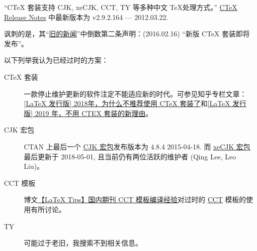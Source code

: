 “CTeX 套装支持 CJK, xeCJK, CCT, TY 等多种中文 \TeX 处理方式。”
\href{http://www.ctex.org/CTeXReleaseNotes}{CTeX Release Notes} 中最新版本为 v2.9.2.164 --- 2012.03.22.

讽刺的是，其“\href{http://www.ctex.org/OldNews}{旧的新闻}”中倒数第二条声明：(2016.02.16) “新版 CTeX 套装即将发布”。

以下列举我认为已经过时的方案：
\begin{description}
\item[CTeX 套装] 一款停止维护更新的软件注定不能适应新的时代。可参见知乎专栏文章：\href{https://zhuanlan.zhihu.com/p/45174503}{[LaTeX 发行版] 2018年，为什么不推荐使用 CTeX 套装了}和\href{https://zhuanlan.zhihu.com/p/73304856}{[LaTeX 发行版] 2019 年，不用 CTEX 套装的新理由}。
\item[CJK 宏包] CTAN 上最后一个 \href{https://www.ctan.org/pkg/cjk}{CJK 宏包}发布版本为 4.8.4 2015-04-18. 而 \href{https://www.ctan.org/pkg/xecjk}{xeCJK 宏包}最后更新于 2018-05-01, 且当前仍有两位活跃的维护者 (Qing Lee, Leo Liu)。
\item[CCT 模板] 博文\href{https://liam.page/2013/10/15/LaTeX-CCT-template/}{【LaTeX Tips】国内期刊 CCT 模板编译经验}对过时的 \href{ftp://ftp.cc.ac.cn/pub/cct/}{CCT} 模板的使用有所讨论。
\item[TY] 可能过于老旧，我搜索不到相关信息。
\end{description}